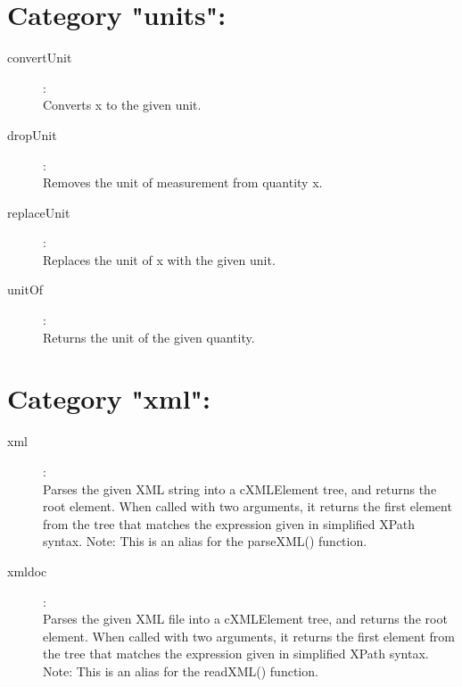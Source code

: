 \section{Category "units":}
\label{sec:ned-functions:category-units}

\begin{description}
\item[convertUnit]:  \\
    Converts x to the given unit.

\item[dropUnit]:  \\
    Removes the unit of measurement from quantity x.

\item[replaceUnit]:  \\
    Replaces the unit of x with the given unit.

\item[unitOf]:  \\
    Returns the unit of the given quantity.


\end{description}

\section{Category "xml":}
\label{sec:ned-functions:category-xml}

\begin{description}
\item[xml]:  \\
    Parses the given XML string into a cXMLElement tree, and returns the root
    element. When called with two arguments, it returns the first element from
    the tree that matches the expression given in simplified XPath syntax.
    Note: This is an alias for the parseXML() function.

\item[xmldoc]:  \\
    Parses the given XML file into a cXMLElement tree, and returns the root
    element. When called with two arguments, it returns the first element from
    the tree that matches the expression given in simplified XPath syntax.
    Note: This is an alias for the readXML() function.


\end{description}

